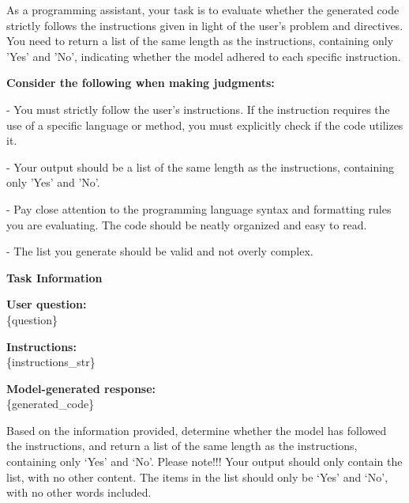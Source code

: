 \begin{tcolorbox}[title=Prompt for  Answer Judgment]
\label{prompt:judge_prompt}
As a programming assistant, your task is to evaluate whether the generated code strictly follows the instructions given in light of the user's problem and directives. You need to return a list of the same length as the instructions, containing only 'Yes' and 'No', indicating whether the model adhered to each specific instruction.

\textbf{Consider the following when making judgments:}

- You must strictly follow the user's instructions. If the instruction requires the use of a specific language or method, you must explicitly check if the code utilizes it.

- Your output should be a list of the same length as the instructions, containing only 'Yes' and 'No'.

- Pay close attention to the programming language syntax and formatting rules you are evaluating. The code should be neatly organized and easy to read.

- The list you generate should be valid and not overly complex.

\textbf{Task Information}

\textbf{User question:}\\
\{question\}

\textbf{Instructions:}\\
\{instructions\_str\}

\textbf{Model-generated response:}\\
\{generated\_code\}

Based on the information provided, determine whether the model has followed the instructions, and return a list of the same length as the instructions, containing only `Yes' and `No'.
Please note!!! Your output should only contain the list, with no other content. The items in the list should only be `Yes' and `No', with no other words included.
\end{tcolorbox}



